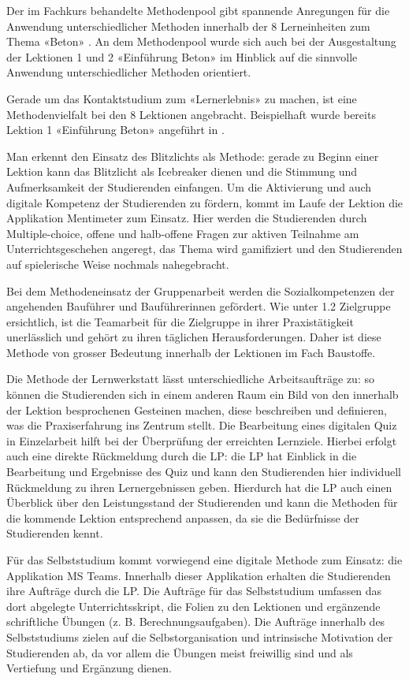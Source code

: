 \documentclass[
11pt,
captions=tableheading,
smallheadings,
headsepline,
footsepline, 
parskip=half-,
]{scrartcl}
\begin{document}
Der im Fachkurs behandelte Methodenpool gibt spannende Anregungen für die Anwendung unterschiedlicher Methoden innerhalb der 8 Lerneinheiten zum Thema «Beton» \cite{unikoelnMethodenpool}. An dem Methodenpool wurde sich auch bei der Ausgestaltung der Lektionen 1 und 2 «Einführung Beton» im Hinblick auf die sinnvolle Anwendung unterschiedlicher Methoden orientiert. 

Gerade um das Kontaktstudium zum «Lernerlebnis» \cite{BerufspädagogischesKonzept_BauschuleAarau} zu machen, ist eine Methodenvielfalt bei den 8 Lektionen angebracht. 
Beispielhaft wurde bereits Lektion 1 «Einführung Beton» angeführt in .

Man erkennt den Einsatz des Blitzlichts als Methode: gerade zu Beginn einer Lektion kann das Blitzlicht als Icebreaker dienen und die Stimmung und Aufmerksamkeit der Studierenden einfangen. 
Um die Aktivierung und auch digitale Kompetenz der Studierenden zu fördern, kommt im Laufe der Lektion die Applikation Mentimeter zum Einsatz. Hier werden die Studierenden durch Multiple-choice, offene und halb-offene Fragen zur aktiven Teilnahme am Unterrichtsgeschehen angeregt, das Thema wird gamifiziert und den Studierenden auf spielerische Weise nochmals nahegebracht. 

Bei dem Methodeneinsatz der Gruppenarbeit werden die Sozialkompetenzen der angehenden Bauführer und Bauführerinnen gefördert. Wie unter 1.2 Zielgruppe ersichtlich, ist die Teamarbeit für die Zielgruppe in ihrer Praxistätigkeit unerlässlich und gehört zu ihren täglichen Herausforderungen. Daher ist diese Methode von grosser Bedeutung innerhalb der Lektionen im Fach Baustoffe. 

Die Methode der Lernwerkstatt lässt unterschiedliche Arbeitsaufträge zu: so können die Studierenden sich in einem anderen Raum ein Bild von den innerhalb der Lektion besprochenen Gesteinen machen, diese beschreiben und definieren, was die Praxiserfahrung ins Zentrum stellt. Die Bearbeitung eines digitalen Quiz in Einzelarbeit hilft bei der Überprüfung der erreichten Lernziele. Hierbei erfolgt auch eine direkte Rückmeldung durch die LP: die LP hat Einblick in die Bearbeitung und Ergebnisse des Quiz und kann den Studierenden hier individuell Rückmeldung zu ihren Lernergebnissen geben. Hierdurch hat die LP auch einen Überblick über den Leistungsstand der Studierenden und kann die Methoden für die kommende Lektion entsprechend anpassen, da sie die Bedürfnisse der Studierenden kennt. 

Für das Selbststudium kommt vorwiegend eine digitale Methode zum Einsatz: die Applikation MS Teams. Innerhalb dieser Applikation erhalten die Studierenden ihre Aufträge durch die LP. Die Aufträge für das Selbststudium umfassen das dort abgelegte Unterrichtsskript, die Folien zu den Lektionen und ergänzende schriftliche Übungen (z. B. Berechnungsaufgaben). Die Aufträge innerhalb des Selbststudiums zielen auf die Selbstorganisation und intrinsische Motivation der Studierenden ab, da vor allem die Übungen meist freiwillig sind und als Vertiefung und Ergänzung dienen. 
\end{document}
